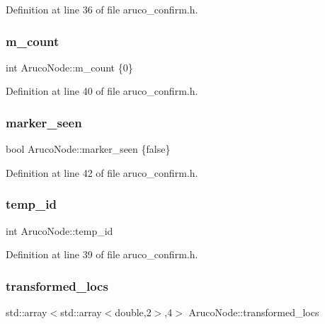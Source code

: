 Definition at line 36 of file aruco\+\_\+confirm.\+h.

\mbox{\label{class_aruco_node_a454cdb8d15fa07e7913887a1b2029600}} 
\subsubsection{\texorpdfstring{m\+\_\+count}{m\_count}}
{\footnotesize\ttfamily int Aruco\+Node\+::m\+\_\+count \{0\}}



Definition at line 40 of file aruco\+\_\+confirm.\+h.

\mbox{\label{class_aruco_node_a21fe489a4ab6a73e807e74a5c1de466d}} 
\subsubsection{\texorpdfstring{marker\+\_\+seen}{marker\_seen}}
{\footnotesize\ttfamily bool Aruco\+Node\+::marker\+\_\+seen \{false\}}



Definition at line 42 of file aruco\+\_\+confirm.\+h.

\mbox{\label{class_aruco_node_ac9561321e855855ccc8f643cc139a638}} 
\subsubsection{\texorpdfstring{temp\+\_\+id}{temp\_id}}
{\footnotesize\ttfamily int Aruco\+Node\+::temp\+\_\+id}



Definition at line 39 of file aruco\+\_\+confirm.\+h.

\mbox{\label{class_aruco_node_ab410bc0b655071ee67e7ba63b4edf256}} 
\subsubsection{\texorpdfstring{transformed\+\_\+locs}{transformed\_locs}}
{\footnotesize\ttfamily std\+::array$<$std\+::array$<$double,2$>$,4$>$ Aruco\+Node\+::transformed\+\_\+locs}




